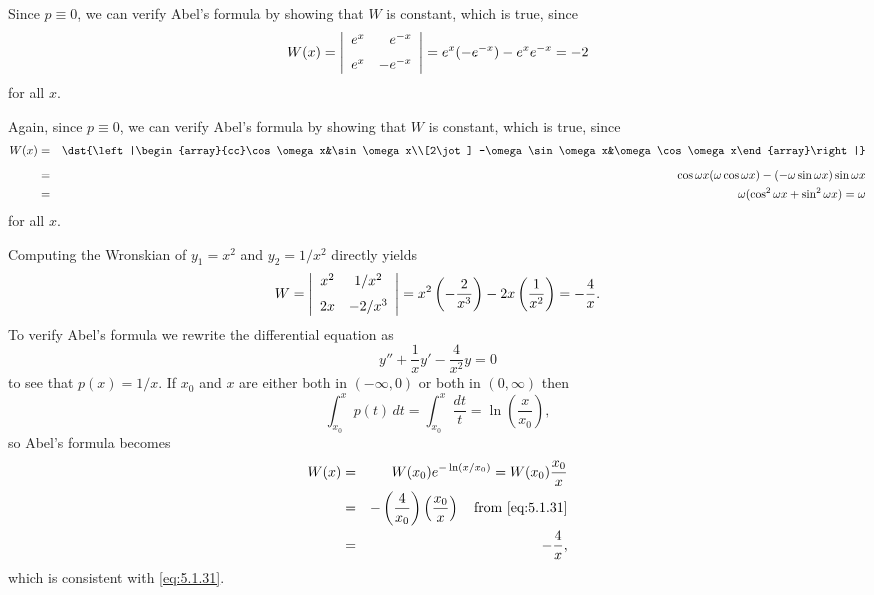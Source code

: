 \begin{examplesolution}
 Since $p\equiv0$, we can verify Abel's formula by showing that $W$ is constant,
which is true, since
\[
  W(x)=\left|
  \begin{array}{rr}
    e^{x} & e^{-x}  \\[2\jot]
    e^{x} & -e^{-x}
  \end{array}\right|=e^{x}(-e^{-x})-e^{x}e^{-x}=-2
\]
for all $x$.

 Again, since $p\equiv0$, we can verify Abel's formula by showing that $W$ is
constant, which is true, since
\begin{eqnarray*}
  W(x)&=&\dst{\left|\begin{array}{cc}\cos\omega x&\sin\omega x\\[2\jot] -\omega\sin\omega x&\omega\cos\omega x\end{array}\right|}\\[2\jot] &=&\cos\omega x(\omega\cos\omega x)-(-\omega\sin\omega x)\sin\omega x\\&=&\omega(\cos^{2}\omega x+\sin^{2}\omega x)=\omega
\end{eqnarray*}
for all $x$.

 Computing the Wronskian of $y_{1}=x^{2}$ and $y_{2}=1/x^{2}$ directly yields
\begin{equation}
  \label{eq:5.1.31}W=\left|
  \begin{array}{cc}
    x^{2} & 1/x^{2}  \\[2\jot]
    2x    & -2/x^{3}
  \end{array}\right|=x^{2}\left(-\frac{2}{x^{3}}\right)-2x\left(\frac{1}{x^{2}}\right)=-\frac{4}{x}.
\end{equation}
To verify Abel's formula we rewrite the differential equation as
\[
  y''+\frac{1}{x}y'-\frac{4}{x^{2}}y=0
\]
to see that $p(x)=1/x$. If $x_{0}$ and $x$ are either both in $(-\infty,0)$ or both in $(0,\infty)$
then
\[
  \int_{x_{0}}^{x}p(t)\,dt=\int_{x_{0}}^{x}\frac{dt}{t}=\ln\left(\frac{x}{x_{0}}\right),
\]
so Abel's formula becomes
\begin{eqnarray*}
  W(x) & = & W(x_{0})e^{-\ln(x/x_{0})}=W(x_{0})\frac{x_{0}}{x}                                            \\
       & = & -\left(\frac{4}{x_{0}}\right)\left(\frac{x_{0}}{x}\right)\mbox{\quad from \eqref{eq:5.1.31}} \\
       & = & -\frac{4}{x},
\end{eqnarray*}
which is consistent with \eqref{eq:5.1.31}.\bbox
\end{examplesolution}

